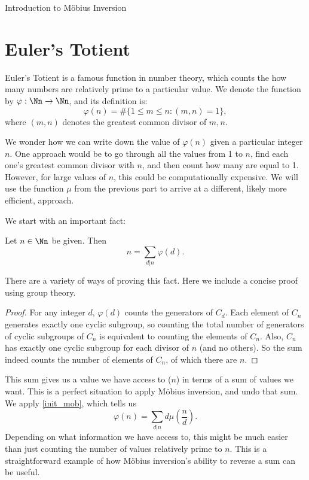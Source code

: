 \documentclass[12pt]{pom_thesis}
\begin{document}
\begin{chapter}{Introduction to M\"obius Inversion}
\section{Euler's Totient}
Euler's Totient is a famous function in number theory, which counts the how many numbers are relatively prime to a particular value. We denote the function by $\varphi : \Nn \rightarrow \Nn$, and its definition is:
\[
\varphi(n) = \#\{1 \leq m \leq n : (m,n) = 1\},
\]
where $(m,n)$ denotes the greatest common divisor of $m,n$.

We wonder how we can write down the value of $\varphi(n)$ given a particular integer $n$. One approach would be to go through all the values from 1 to $n$, find each one's greatest common divisor with $n$, and then count how many are equal to 1. However, for large values of $n$, this could be computationally expensive. We will use the function $\mu$ from the previous part to arrive at a different, likely more efficient, approach.

We start with an important fact:
\begin{thm}[Gauss]\label{gauss}
Let $n \in \Nn$ be given. Then 
\[
n = \sum_{d|n}\varphi(d).
\]
\end{thm}
There are a variety of ways of proving this fact. Here we include a concise proof using group theory.
\begin{proof}
For any integer $d$, $\varphi(d)$ counts the generators of $C_d$. Each element of $C_n$ generates exactly one cyclic subgroup, so counting the total number of generators of cyclic subgroups of $C_n$ is equivalent to counting the elements of $C_n$. Also, $C_n$ has exactly one cyclic subgroup for each divisor of $n$ (and no others). So the sum indeed counts the number of elements of $C_n$, of which there are $n$.
\end{proof}
This sum gives us a value we have access to ($n$) in terms of a sum of values we want. This is a perfect situation to apply M\"obius inversion, and undo that sum. We apply \ref{init_mob}, which tells us
\[
\varphi(n) = \sum_{d|n} d\mu\left(\frac nd\right).
\]
Depending on what information we have access to, this might be much easier than just counting the number of values relatively prime to $n$. This is a straightforward example of how M\"obius inversion's ability to reverse a sum can be useful.
\end{chapter}
\end{document}
